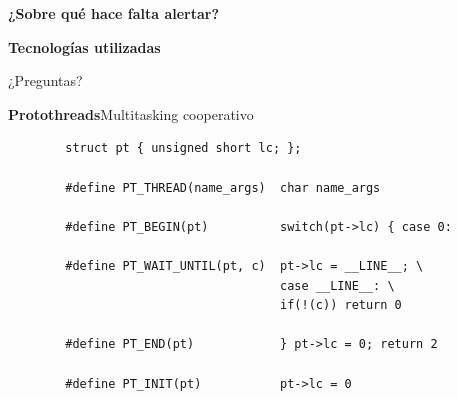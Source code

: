 \documentclass[11pt]{beamer}
\begin{document}
\begin{frame}{\textbf{\LARGE{¿Sobre qué hace falta alertar?}}}
\fontsize{18pt}{18}\selectfont

\end{frame}

\begin{frame}{\textbf{\LARGE{Tecnologías utilizadas}}}
\fontsize{18pt}{18}\selectfont
\end{frame}


\begin{frame}[plain,c]
\begin{center}
\Huge ¿Preguntas?
\end{center}

\end{frame}


\begin{frame}[fragile]{\textbf{\LARGE{Protothreads}}}{Multitasking cooperativo}
	\vspace{-.7cm}
	\begin{verbatim}
		struct pt { unsigned short lc; };
		
		#define PT_THREAD(name_args)  char name_args

		#define PT_BEGIN(pt)          switch(pt->lc) { case 0:

		#define PT_WAIT_UNTIL(pt, c)  pt->lc = __LINE__; \
		                              case __LINE__: \
		                              if(!(c)) return 0

		#define PT_END(pt)            } pt->lc = 0; return 2

		#define PT_INIT(pt)           pt->lc = 0
	\end{verbatim}
\end{frame}
\end{document}

